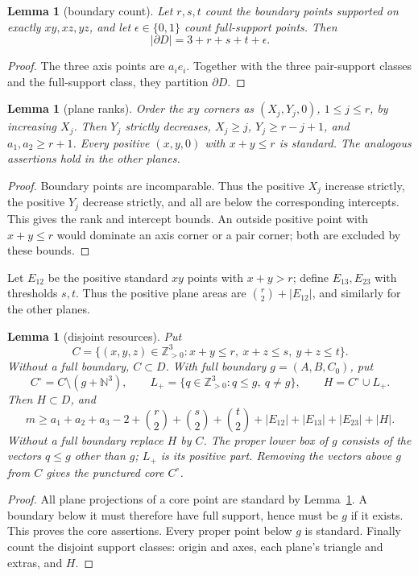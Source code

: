 \documentclass[11pt]{article}
\newtheorem{lemma}[theorem]{Lemma}
\theoremstyle{definition}
\theoremstyle{remark}
\theoremstyle{plain}
\begin{document}
\begin{lemma}[boundary count]\label{res:A.2}
Let $r,s,t$ count the boundary points supported on exactly $xy,xz,yz$,
and let $\epsilon\in\{0,1\}$ count full-support points. Then
\[
 |\partial D|=3+r+s+t+\epsilon.
\]
\end{lemma}
\begin{proof}
The three axis points are $a_ie_i$. Together with the three pair-support
classes and the full-support class, they partition $\partial D$. \end{proof}

\begin{lemma}[plane ranks]\label{res:A.3}
Order the $xy$ corners as $(X_j,Y_j,0)$, $1\le j\le r$, by increasing
$X_j$. Then $Y_j$ strictly decreases,
$X_j\ge j$, $Y_j\ge r-j+1$, and $a_1,a_2\ge r+1$.
Every positive $(x,y,0)$ with $x+y\le r$ is standard.
The analogous assertions hold in the other planes.
\end{lemma}
\begin{proof}
Boundary points are incomparable. Thus the positive $X_j$ increase
strictly, the positive $Y_j$ decrease strictly, and all are below the
corresponding intercepts. This gives the rank and intercept bounds.
An outside positive point with $x+y\le r$ would dominate an axis corner
or a pair corner; both are excluded by these bounds. \end{proof}

Let $E_{12}$ be the positive standard $xy$ points with $x+y>r$;
define $E_{13},E_{23}$ with thresholds $s,t$. Thus the positive plane
areas are $\binom r2+|E_{12}|$, and similarly for the other planes.

\begin{lemma}[disjoint resources]\label{res:A.4}
Put
\[
 C=\{(x,y,z)\in\mathbb Z_{>0}^3:x+y\le r,\ x+z\le s,\ y+z\le t\}.
\]
Without a full boundary, $C\subset D$. With full boundary
$g=(A,B,C_0)$, put
\[
 C^\circ=C\setminus(g+\mathbb N^3),\qquad
 L_+=\{q\in\mathbb Z_{>0}^3:q\le g,\ q\ne g\},\qquad H=C^\circ\cup L_+.
\]
Then $H\subset D$, and
\[
 m\ge a_1+a_2+a_3-2+
 \binom r2+\binom s2+\binom t2+
 |E_{12}|+|E_{13}|+|E_{23}|+|H|.\tag{3.1}\label{eq:capacity-1}
\]
Without a full boundary replace $H$ by $C$.
The proper lower box of $g$ consists of the vectors $q\le g$ other than
$g$; $L_+$ is its positive part. Removing the vectors above $g$ from $C$
gives the punctured core $C^\circ$.
\end{lemma}
\begin{proof}
All plane projections of a core point are standard by Lemma~\ref{res:A.3}. A boundary
below it must therefore have full support, hence must be $g$ if it
exists. This proves the core assertions. Every proper point below $g$
is standard. Finally count the disjoint support classes: origin and
axes, each plane's triangle and extras, and $H$. \end{proof}
\end{document}
